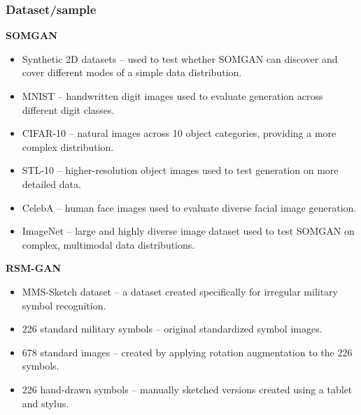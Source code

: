 \documentclass[12pt,a4paper]{article}
\begin{document}
\subsubsection{Dataset/sample}
\textbf{SOMGAN}
\begin{itemize}
    \item Synthetic 2D datasets – used to test whether SOMGAN can discover and cover different modes of a simple data distribution.
    \item MNIST – handwritten digit images used to evaluate generation across different digit classes.
    \item CIFAR-10 – natural images across 10 object categories, providing a more complex distribution.
    \item STL-10 – higher-resolution object images used to test generation on more detailed data.
    \item CelebA – human face images used to evaluate diverse facial image generation.
    \item ImageNet – large and highly diverse image dataset used to test SOMGAN on complex, multimodal data distributions.
\end{itemize}

\textbf{RSM-GAN}
\begin{itemize}
    \item MMS-Sketch dataset – a dataset created specifically for irregular military symbol recognition.
    \item 226 standard military symbols – original standardized symbol images.
    \item 678 standard images – created by applying rotation augmentation to the 226 symbols.
    \item 226 hand-drawn symbols – manually sketched versions created using a tablet and stylus.
\end{itemize}
\end{document}
